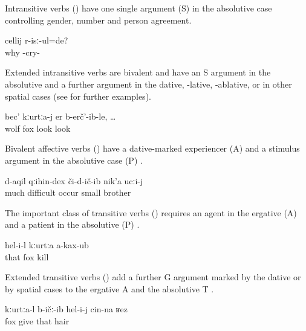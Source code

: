 Intransitive verbs () have one single argument (S) in the absolutive case controlling gender, number and person agreement.

\begin{exe}
	\ex	\label{ex:She is crying.Why}
	\gll	cellij r-isː-ul=de?	\\
		why -cry- 	\\
	\glt	{}
\end{exe}

Extended intransitive verbs are bivalent and have an S argument in the absolutive and a further argument in the dative, -lative, -ablative, or in other spatial cases  (see  for further examples).
%
\begin{exe}
	\ex	\label{ex:The wolf looked at the fox}
	\gll	bec'	kːurtːa-j er	b-erč'-ib-le, \ldots	\\
		wolf	fox look	look	\\
	\glt	{}
\end{exe}

Bivalent affective verbs () have a dative-marked experiencer (A) and a stimulus argument in the absolutive case (P) .
%
\begin{exe}
	\ex	\label{ex:‎‎‎The little brother experienced many difficulties}
	\gll	d-aqil	qːihin-dex	či-d-ič-ib	nik'a	ucːi-j\\
		much	difficult	occur	small	brother\\
	\glt	{}
\end{exe}

The important class of transitive verbs () requires an agent in the ergative (A) and a patient in the absolutive (P) . 
%
\begin{exe}
	\ex	\label{ex:He did not kill the fox}
	\gll	hel-i-l	kːurtːa a-kax-ub\\
		that	fox kill\\
	\glt	{}
\end{exe}

Extended transitive verbs () add a further G argument marked by the dative or by spatial cases to the ergative A and the absolutive T .
%
\begin{exe}
	\ex	\label{ex:The fox gave him his hair}
	\gll	kːurtːa-l	b-ičː-ib	hel-i-j	cin-na	ʁez\\
		fox	give	that		hair\\
	\glt	{}
\end{exe}


